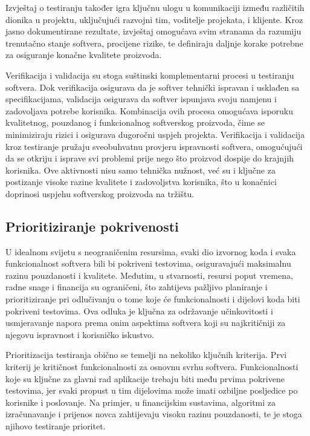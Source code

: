 Izvještaj o testiranju također igra ključnu ulogu u komunikaciji između različitih dionika u projektu, uključujući razvojni tim, voditelje projekata, i klijente.
Kroz jasno dokumentirane rezultate, izvještaj omogućava svim stranama da razumiju trenutačno stanje softvera, procijene rizike, te definiraju daljnje korake potrebne za osiguranje konačne kvalitete proizvoda.

Verifikacija i validacija su stoga suštinski komplementarni procesi u testiranju softvera.
Dok verifikacija osigurava da je softver tehnički ispravan i usklađen sa specifikacijama, validacija osigurava da softver ispunjava svoju namjenu i zadovoljava potrebe korisnika.
Kombinacija ovih procesa omogućava isporuku kvalitetnog, pouzdanog i funkcionalnog softverskog proizvoda, čime se minimiziraju rizici i osigurava dugoročni uspjeh projekta.
Verifikacija i validacija kroz testiranje pružaju sveobuhvatnu provjeru ispravnosti softvera, omogućujući da se otkriju i isprave svi problemi prije nego što proizvod dospije do krajnjih korisnika.
Ove aktivnosti nisu samo tehnička nužnost, već su i ključne za postizanje visoke razine kvalitete i zadovoljstva korisnika, što u konačnici doprinosi uspjehu softverskog proizvoda na tržištu.

\subsection*{Prioritiziranje pokrivenosti}
U idealnom svijetu s neograničenim resursima, svaki dio izvornog koda i svaka funkcionalnost softvera bili bi pokriveni testovima, osiguravajući maksimalnu razinu pouzdanosti i kvalitete.
Međutim, u stvarnosti, resursi poput vremena, radne snage i financija su ograničeni, što zahtijeva pažljivo planiranje i prioritiziranje pri odlučivanju o tome koje će funkcionalnosti i dijelovi koda biti pokriveni testovima.
Ova odluka je ključna za održavanje učinkovitosti i usmjeravanje napora prema onim aspektima softvera koji su najkritičniji za njegovu ispravnost i korisničko iskustvo.

Prioritizacija testiranja obično se temelji na nekoliko ključnih kriterija.
Prvi kriterij je kritičnost funkcionalnosti za osnovnu svrhu softvera.
Funkcionalnosti koje su ključne za glavni rad aplikacije trebaju biti među prvima pokrivene testovima, jer svaki propust u tim dijelovima može imati ozbiljne posljedice po korisnike i poslovanje.
Na primjer, u financijskim sustavima, algoritmi za izračunavanje i prijenos novca zahtijevaju visoku razinu pouzdanosti, te je stoga njihovo testiranje prioritet.


